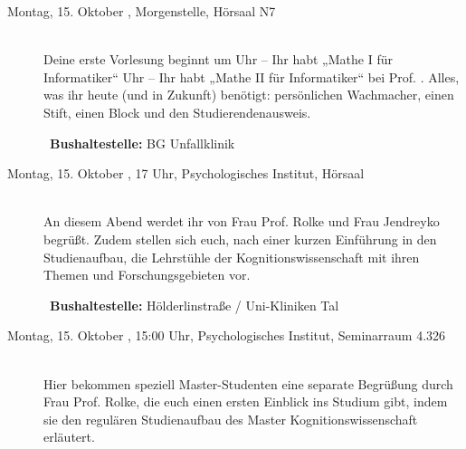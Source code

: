 \begin{description}
\ifbachelor
\item[Montag, 15. Oktober \Jahr, Morgenstelle, Hörsaal N7]\ \\
Deine erste Vorlesung beginnt um
 Uhr -- Ihr habt „Mathe I für Informatiker“  \fi
{} Uhr -- Ihr habt „Mathe II für Informatiker“  \fi
bei Prof. \Matheprof.
Alles, was ihr heute (und in Zukunft) benötigt: persönlichen Wachmacher, einen Stift, einen Block und den Studierendenausweis.

~\textbf{Bushaltestelle:} BG Unfallklinik
\fi





\ifkogwiss
\ifbachelor
\item[Montag, 15. Oktober \Jahr, 17 Uhr, Psychologisches Institut, Hörsaal]\ \\
An diesem Abend werdet ihr von Frau Prof. Rolke und Frau Jendreyko begrüßt. Zudem stellen sich euch, nach einer kurzen Einführung in den Studienaufbau, die Lehrstühle der Kognitionswissenschaft mit ihren Themen und Forschungsgebieten vor.
\fi

~\textbf{Bushaltestelle:} Hölderlinstraße / Uni-Kliniken Tal
\fi

\ifkogwiss
\ifmaster
\item[Montag, 15. Oktober \Jahr, 15:00 Uhr, Psychologisches Institut, Seminarraum 4.326 ]\ \\
Hier bekommen speziell Master-Studenten eine separate Begrüßung durch Frau Prof. Rolke, die euch einen ersten Einblick ins Studium gibt, indem sie den regulären Studienaufbau des Master Kognitionswissenschaft erläutert. %
\fi
\fi





\end{description}
